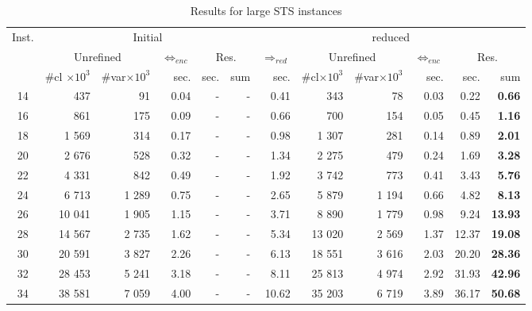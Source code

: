 \documentclass[3p,authoryear,times]{elsarticle}
\newcommand{\rmin}[0]{{\Rightarrow_{red}}}
\newcommand{\enc}[0]{\Leftrightarrow_{enc}}
\begin{document}
{\setlength{\tabcolsep}{0.06cm}
\begin{table}[t]
\caption{Results for large STS instances}%
\label{tab:largeSTSdis}
\begin{center}
\begin{scriptsize}
\color{red}
\begin{tabular}{|c | r | r | r | r |r |r |r |r |r |r |r|}
\hline
\multirow{3}{*}{Inst.}	&\multicolumn{5}{c|}{Initial}	&\multicolumn{6}{c|}{reduced}\\
	&\multicolumn{2}{c|}{Unrefined}&$\enc$	&\multicolumn{2}{c|}{Res.}	&$\rmin$	&\multicolumn{2}{c|}{Unrefined}	&$\enc$	&\multicolumn{2}{c|}{Res.}\\
	&\#cl $\times 10^3$	&\#var$\times 10^3$	&sec.	&sec.	&sum	&sec.	&\#cl$\times 10^3$	&\#var$\times 10^3$	&sec.	&sec.	&sum	\\
\hline
14	&437	&91 	&0.04	&- 	&-	&0.41	&343	&78 	&0.03	&0.22	&\textbf{0.66}\\
16	&861	&175	&0.09	&-	&-	&0.66	&700	&154 	&0.05	&0.45	&\textbf{1.16}\\
18	&1 569	&314	&0.17	&-	&-	&0.98	&1 307	&281&0.14	&0.89	&\textbf{2.01}\\
20	&2 676	&528	&0.32	&-	&-	&1.34	&2 275	&479	&0.24	&1.69	&\textbf{3.28}\\
22	&4 331	&842 	&0.49	&-	&-	&1.92	&3 742 	&773	&0.41	&3.43	&\textbf{5.76}\\
24	&6 713	&1 289	&0.75	&-	&-	&2.65	&5 879	&1 194 	&0.66	&4.82	&\textbf{8.13}\\
26	&10 041	&1 905 	&1.15	&-	&-	&3.71	&8 890 	&1 779	&0.98	&9.24	&\textbf{13.93}\\
28	&14 567	&2 735	&1.62	&-	&-	&5.34	&13 020	&2 569 	&1.37	&12.37	&\textbf{19.08}\\
30	&20 591	&3 827 	&2.26	&-	&-	&6.13	&18 551 	&3 616	&2.03	&20.20	&\textbf{28.36}\\
32	&28 453	&5 241	&3.18	&-	&-	&8.11	&25 813 	&4 974	&2.92	&31.93	&\textbf{42.96}\\
34	&38 581	&7 059	&4.00	&-	&-	&10.62	&35 203 	&6 719	&3.89	&36.17	&\textbf{50.68}\\

\end{tabular}
\end{scriptsize}
\end{center}
\end{table}}
\end{document}
